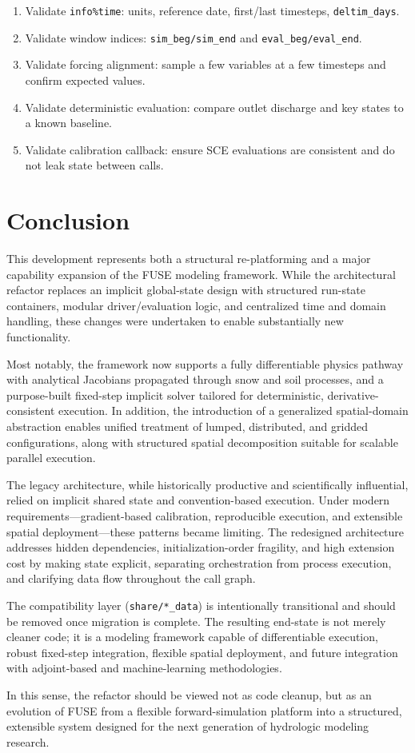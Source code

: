\documentclass[11pt]{scrartcl}
\begin{document}
\begin{enumerate}[leftmargin=*]
\item Validate \texttt{info\%time}: units, reference date, first/last timesteps, \texttt{deltim\_days}.
\item Validate window indices: \texttt{sim\_beg/sim\_end} and \texttt{eval\_beg/eval\_end}.
\item Validate forcing alignment: sample a few variables at a few timesteps and confirm expected values.
\item Validate deterministic evaluation: compare outlet discharge and key states to a known baseline.
\item Validate calibration callback: ensure SCE evaluations are consistent and do not leak state between calls.
\end{enumerate}

\section{Conclusion}

This development represents both a structural re-platforming and a major capability
expansion of the FUSE modeling framework. While the architectural refactor replaces
an implicit global-state design with structured run-state containers, modular
driver/evaluation logic, and centralized time and domain handling, these changes
were undertaken to enable substantially new functionality.

Most notably, the framework now supports a fully differentiable physics pathway
with analytical Jacobians propagated through snow and soil processes, and a
purpose-built fixed-step implicit solver tailored for deterministic,
derivative-consistent execution. In addition, the introduction of a generalized
spatial-domain abstraction enables unified treatment of lumped, distributed,
and gridded configurations, along with structured spatial decomposition suitable
for scalable parallel execution.

The legacy architecture, while historically productive and scientifically
influential, relied on implicit shared state and convention-based execution.
Under modern requirements—gradient-based calibration, reproducible execution,
and extensible spatial deployment—these patterns became limiting. The redesigned
architecture addresses hidden dependencies, initialization-order fragility, and
high extension cost by making state explicit, separating orchestration from
process execution, and clarifying data flow throughout the call graph.

The compatibility layer (\texttt{share/*\_data}) is intentionally transitional and
should be removed once migration is complete. The resulting end-state is not
merely cleaner code; it is a modeling framework capable of differentiable
execution, robust fixed-step integration, flexible spatial deployment, and
future integration with adjoint-based and machine-learning methodologies.

In this sense, the refactor should be viewed not as code cleanup, but as an
evolution of FUSE from a flexible forward-simulation platform into a structured,
extensible system designed for the next generation of hydrologic modeling
research.
\end{document}
